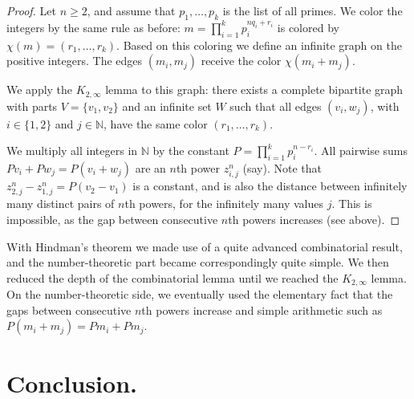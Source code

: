 \documentclass{article}
\theoremstyle{theorem}
\theoremstyle{definition}
\newcommand{\N}{\mathbb N}
\begin{document}
\begin{proof}
Let $n\geq 2$, and assume that $p_1, \ldots , p_k$ is the list of all primes.
 We color the integers by the same rule as before:
$m= \prod_{i=1}^k p_i^{n q_i +r_i}$ is colored by $\chi(m)=(r_1, \ldots ,r_k)$.
Based on this coloring we define an infinite graph on the positive integers. 
The edges $(m_i,m_j)$ receive the color $\chi(m_i+m_j)$.

We apply the $K_{2,\infty}$ lemma to this graph: 
there exists a complete bipartite graph with parts $V=\{v_1,v_2\}$ and an
infinite set $W$
 such that all
 edges $(v_i,w_j)$, with $i\in \{1,2\}$ and $j \in \N$, have the same color
 $(r_1, \ldots ,r_k)$.

We multiply all integers in $\N$ by the constant
$P=\prod_{i=1}^k p_i^{n-r_i}$.
All pairwise sums
$Pv_i+Pw_j=P(v_i+w_j)$ are an $n$th power $z_{i,j}^n$ (say). Note
that $z_{2,j}^n-z_{1,j}^n=P(v_2-v_1)$ is a constant, 
and is also the distance between infinitely many distinct
pairs of $n$th powers, for the infinitely many values $j$.
This is impossible, as
the gap between consecutive $n$th powers increases (see above).
\end{proof}



With Hindman's theorem we
made use of a quite advanced combinatorial result, 
and the number-theoretic part became correspondingly quite simple.
We then reduced the depth of the combinatorial lemma until we reached 
the $K_{2, \infty}$ lemma.
On the number-theoretic side, we eventually used the elementary
fact that the gaps between consecutive $n$th powers increase and simple
arithmetic such as $P(m_i+m_j)=Pm_i+Pm_j$.

\section{Conclusion.}
 
\end{document}
